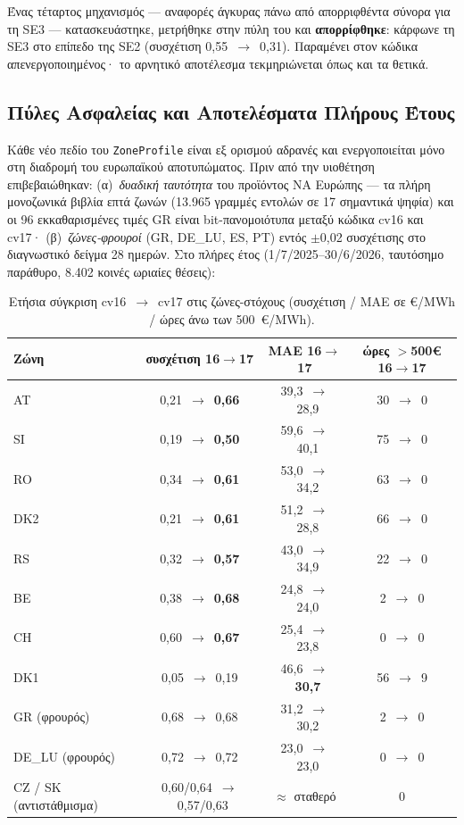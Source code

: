 Ένας τέταρτος μηχανισμός --- αναφορές άγκυρας πάνω από απορριφθέντα σύνορα για τη SE3 --- κατασκευάστηκε, μετρήθηκε στην πύλη του και \textbf{απορρίφθηκε}: κάρφωνε τη SE3 στο επίπεδο της SE2 (συσχέτιση 0,55~$\to$~0,31). Παραμένει στον κώδικα απενεργοποιημένος· το αρνητικό αποτέλεσμα τεκμηριώνεται όπως και τα θετικά.

\subsection{Πύλες Ασφαλείας και Αποτελέσματα Πλήρους Έτους}
\label{subsec:cv17-results}

Κάθε νέο πεδίο του \texttt{ZoneProfile} είναι εξ ορισμού αδρανές και ενεργοποιείται μόνο στη διαδρομή του ευρωπαϊκού αποτυπώματος. Πριν από την υιοθέτηση επιβεβαιώθηκαν: (α)~\emph{δυαδική ταυτότητα} του προϊόντος ΝΑ Ευρώπης --- τα πλήρη μονοζωνικά βιβλία επτά ζωνών (13.965 γραμμές εντολών σε 17 σημαντικά ψηφία) και οι 96 εκκαθαρισμένες τιμές GR είναι bit-πανομοιότυπα μεταξύ κώδικα cv16 και cv17· (β)~\emph{ζώνες-φρουροί} (GR, DE\_LU, ES, PT) εντός $\pm$0,02 συσχέτισης στο διαγνωστικό δείγμα 28 ημερών. Στο πλήρες έτος (1/7/2025--30/6/2026, ταυτόσημο παράθυρο, 8.402 κοινές ωριαίες θέσεις):

\begin{table}[htbp]
\centering
\caption{Ετήσια σύγκριση cv16~$\to$~cv17 στις ζώνες-στόχους (συσχέτιση / MAE σε €/MWh / ώρες άνω των 500~€/MWh).}
\label{tab:cv17-movers}
\begin{tabular}{@{}lccc@{}}
\toprule
\textbf{Ζώνη} & \textbf{συσχέτιση 16$\to$17} & \textbf{MAE 16$\to$17} & \textbf{ώρες $>$500€ 16$\to$17} \\
\midrule
AT & 0,21~$\to$~\textbf{0,66} & 39,3~$\to$~28,9 & 30~$\to$~0 \\
SI & 0,19~$\to$~\textbf{0,50} & 59,6~$\to$~40,1 & 75~$\to$~0 \\
RO & 0,34~$\to$~\textbf{0,61} & 53,0~$\to$~34,2 & 63~$\to$~0 \\
DK2 & 0,21~$\to$~\textbf{0,61} & 51,2~$\to$~28,8 & 66~$\to$~0 \\
RS & 0,32~$\to$~\textbf{0,57} & 43,0~$\to$~34,9 & 22~$\to$~0 \\
BE & 0,38~$\to$~\textbf{0,68} & 24,8~$\to$~24,0 & 2~$\to$~0 \\
CH & 0,60~$\to$~\textbf{0,67} & 25,4~$\to$~23,8 & 0~$\to$~0 \\
DK1 & 0,05~$\to$~0,19 & 46,6~$\to$~\textbf{30,7} & 56~$\to$~9 \\
\midrule
GR (φρουρός) & 0,68~$\to$~0,68 & 31,2~$\to$~30,2 & 2~$\to$~0 \\
DE\_LU (φρουρός) & 0,72~$\to$~0,72 & 23,0~$\to$~23,0 & 0~$\to$~0 \\
CZ / SK (αντιστάθμισμα) & 0,60/0,64~$\to$~0,57/0,63 & $\approx$ σταθερό & 0 \\
\bottomrule
\end{tabular}
\end{table}

